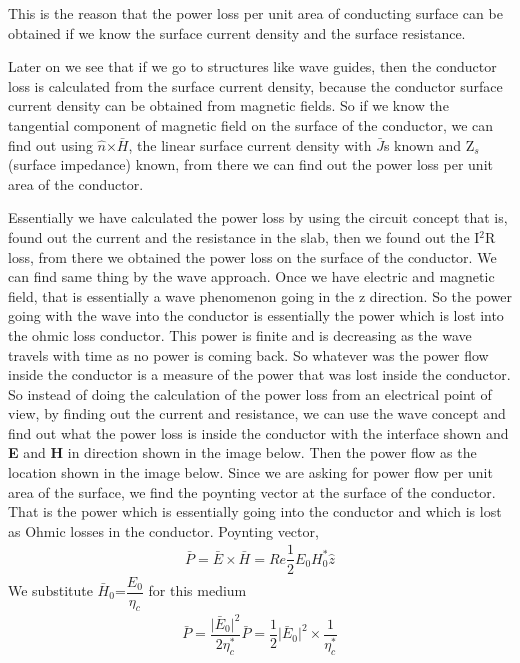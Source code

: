 This is the reason that the power loss per unit area of conducting surface can be obtained if we know the surface current density and the surface resistance.

Later on we see that if we go to structures like wave guides, then the conductor loss is calculated from the surface current density, because the conductor surface current density can be obtained from magnetic fields. So if we know the tangential component of magnetic field on the surface of the conductor, we can find out using $\hat{n}$$\times $$\bar{H}$, the linear surface current density with $\bar{J}$s known and Z$_{s}$(surface impedance) known, from there we can find out the power loss per unit area of the conductor.

Essentially we have calculated the power loss by using the circuit concept that is, found out the current and the resistance in the slab, then we found out the I$^{2}$R loss, from there we obtained the power loss on the surface of the conductor. We can find same thing by the wave approach. Once we have electric and magnetic field, that is essentially a wave phenomenon going in the z direction. So the power going with the wave into the conductor is essentially the power which is lost into the ohmic loss conductor. This power is finite and is decreasing as the wave travels with time as no power is coming back. So whatever was the power flow inside the conductor is a measure of the power that was lost inside the conductor. So instead of doing the calculation of the power loss from an electrical point of view, by finding out the current and resistance, we can use the wave concept and find out what the power loss is inside the conductor with the interface shown and \textbf{E} and \textbf{H} in direction shown in the image below. Then the power flow as the location shown in the image below. Since we are asking for power flow per unit area of the surface, we find the poynting vector at the surface of the conductor. That is the power which is essentially going into the conductor and which is lost as Ohmic losses in the conductor.
Poynting vector,
\begin{align}
\bar{P}=\bar{E}\times \bar{H}=Re\dfrac{1}{2}E_{0}H_{0}^{\ast}\hat{z}
\end{align}
We substitute $\bar{H}$$_{0}$=$\dfrac{E_{0}}{\eta_{c}}$ for this medium
\begin{align}
\bar{P}=\dfrac{\lvert\bar{E}_{0}\rvert^{2}}{2\eta_{c}^{\ast}}
\bar{P}=\dfrac{1}{2}\lvert\bar{E}_{0}\rvert^{2}\times \dfrac{1}{\eta_{c}^{\ast}}
\end{align}

